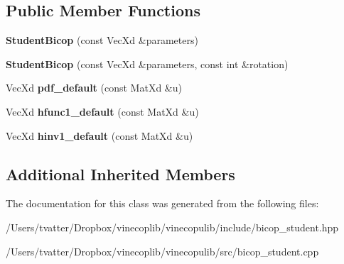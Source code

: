 \subsection*{Public Member Functions}
\begin{DoxyCompactItemize}
\item 
\mbox{\label{class_student_bicop_a3c022a1efe1060453b3418f1fa55ebaa}} 
{\bfseries Student\+Bicop} (const Vec\+Xd \&parameters)
\item 
\mbox{\label{class_student_bicop_a74ee1a778893916dd4fe0745562d784c}} 
{\bfseries Student\+Bicop} (const Vec\+Xd \&parameters, const int \&rotation)
\item 
\mbox{\label{class_student_bicop_a398dcd183989b356e63b7b929b062b39}} 
Vec\+Xd {\bfseries pdf\+\_\+default} (const Mat\+Xd \&u)
\item 
\mbox{\label{class_student_bicop_ac7b273165caa154d649bb0f2e25833c6}} 
Vec\+Xd {\bfseries hfunc1\+\_\+default} (const Mat\+Xd \&u)
\item 
\mbox{\label{class_student_bicop_abf90b4ed51ca88f166e6ed679c22e183}} 
Vec\+Xd {\bfseries hinv1\+\_\+default} (const Mat\+Xd \&u)
\end{DoxyCompactItemize}
\subsection*{Additional Inherited Members}


The documentation for this class was generated from the following files\+:\begin{DoxyCompactItemize}
\item 
/\+Users/tvatter/\+Dropbox/vinecoplib/vinecopulib/include/bicop\+\_\+student.\+hpp\item 
/\+Users/tvatter/\+Dropbox/vinecoplib/vinecopulib/src/bicop\+\_\+student.\+cpp\end{DoxyCompactItemize}
